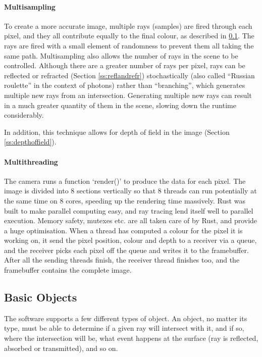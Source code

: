 \documentclass[a4paper]{article}
\begin{document}
\paragraph{Multisampling} To create a more accurate image, multiple rays (samples) are fired through each pixel, and they all contribute equally to the final colour, as described in \ref{}. The rays are fired with a small element of randomness to prevent them all taking the same path. Multisampling also allows the number of rays in the scene to be controlled. Although there are a greater number of rays per pixel, rays can be reflected or refracted (Section \ref{ss:reflandrefr}) stochastically (also called ``Russian roulette'' in the context of photons) rather than ``branching'', which generates multiple new rays from an intersection. Generating multiple new rays can result in a much greater quantity of them in the scene, slowing down the runtime considerably.

In addition, this technique allows for depth of field in the image (Section \ref{ss:depthoffield}).

\paragraph{Multithreading}
The camera runs a function `render()' to produce the data for each pixel. The image is divided into 8 sections vertically so that 8 threads can run potentially at the same time on 8 cores, speeding up the rendering time massively. Rust was built to make parallel computing easy, and ray tracing lend itself well to parallel execution. Memory safety, mutexes etc. are all taken care of by Rust, and provide a huge optimisation. When a thread has computed a colour for the pixel it is working on, it send the pixel position, colour and depth to a receiver via a queue, and the receiver picks each pixel off the queue and writes it to the framebuffer. After all the sending threads finish, the receiver thread finishes too, and the framebuffer contains the complete image.

\subsection{Basic Objects}
The software supports a few different types of object. An object, no matter its type, must be able to determine if a given ray will intersect with it, and if so, where the intersection will be, what event happens at the surface (ray is reflected, absorbed or transmitted), and so on.
\end{document}
